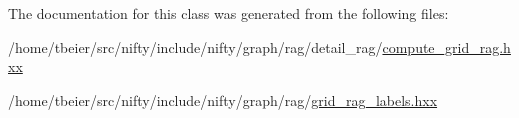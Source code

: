 The documentation for this class was generated from the following files\+:\begin{DoxyCompactItemize}
\item 
/home/tbeier/src/nifty/include/nifty/graph/rag/detail\+\_\+rag/\hyperlink{compute__grid__rag_8hxx}{compute\+\_\+grid\+\_\+rag.\+hxx}\item 
/home/tbeier/src/nifty/include/nifty/graph/rag/\hyperlink{grid__rag__labels_8hxx}{grid\+\_\+rag\+\_\+labels.\+hxx}\end{DoxyCompactItemize}
